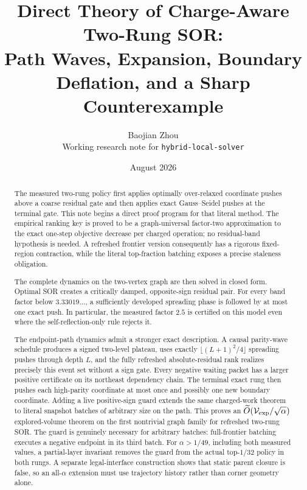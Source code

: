 \documentclass[11pt]{article}
\title{Direct Theory of Charge-Aware Two-Rung SOR:\\
Path Waves, Expansion, Boundary Deflation, and a Sharp Counterexample}
\author{Baojian Zhou\\
\small Working research note for \texttt{hybrid-local-solver}}
\date{August 2026}
\begin{document}
\maketitle

\begin{abstract}
The measured two-rung policy first applies optimally over-relaxed coordinate
pushes above a coarse residual gate and then applies exact Gauss--Seidel
pushes at the terminal gate. This note begins a direct proof program for that
literal method. The empirical ranking key is proved to be a graph-universal
factor-two approximation to the exact one-step objective decrease per charged
operation; no residual-band hypothesis is needed. A refreshed frontier
version consequently has a rigorous fixed-region contraction, while the
literal top-fraction batching exposes a precise staleness obligation.

The complete dynamics on the two-vertex graph are then solved in closed
form. Optimal SOR creates a critically damped, opposite-sign residual pair.
For every band factor below $3.33019\ldots$, a sufficiently developed
spreading phase is followed by at most one exact push. In particular, the
measured factor $2.5$ is certified on this model even where the
self-reflection-only rule rejects it.

The endpoint-path dynamics admit a stronger exact description. A causal
parity-wave schedule produces a signed two-level plateau, uses exactly
$\lfloor(L+1)^2/4\rfloor$ spreading pushes through depth $L$, and the fully
refreshed absolute-residual rank realizes precisely this event set without a
sign gate. Every negative waiting packet has a larger positive certificate
on its northeast dependency chain. The terminal exact rung then pushes each
high-parity coordinate at most once and possibly one new boundary coordinate.
Adding a live positive-sign guard extends the same charged-work theorem to
literal snapshot batches of arbitrary size on the path. This proves an
$\widetilde O(\mathcal V_{\rm exp}/\sqrt\alpha)$ explored-volume theorem on
the first nontrivial graph family for refreshed two-rung SOR.  The guard is
genuinely necessary for arbitrary batches: full-frontier batching executes a
negative endpoint in its third batch.  For $\alpha>1/49$, including both
measured values, a partial-layer invariant removes the guard from the actual
top-$1/32$ policy in both rungs.  A separate legal-interface construction
shows that static parent closure is false, so an all-$\alpha$ extension must
use trajectory history rather than corner geometry alone.


\end{abstract}
\end{document}
